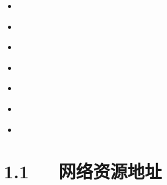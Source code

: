 \documentclass[letterpaper,12pt,english]{sphinxmanual}
\begin{document}
\begin{sphinxShadowBox}
\begin{itemize}
\begin{itemize}
\begin{itemize}
\item {} 
\label{\detokenize{001software/001install/linux:id97}}{\hyperref[\detokenize{001software/001install/linux:id26}]{}}

\item {} 
\label{\detokenize{001software/001install/linux:id98}}{\hyperref[\detokenize{001software/001install/linux:xcopy-win-vs-cp-linux}]{}}

\item {} 
\label{\detokenize{001software/001install/linux:id99}}{\hyperref[\detokenize{001software/001install/linux:gnumake-wildcard-win-vs-cp-linux}]{}}

\item {} 
\label{\detokenize{001software/001install/linux:id100}}{\hyperref[\detokenize{001software/001install/linux:id27}]{}}

\item {} 
\label{\detokenize{001software/001install/linux:id101}}{\hyperref[\detokenize{001software/001install/linux:linuxatime-mtime-ctime}]{}}

\item {} 
\label{\detokenize{001software/001install/linux:id102}}{\hyperref[\detokenize{001software/001install/linux:id28}]{}}

\item {} 
\label{\detokenize{001software/001install/linux:id103}}{\hyperref[\detokenize{001software/001install/linux:id29}]{}}

\end{itemize}

\end{itemize}

\end{itemize}
\end{sphinxShadowBox}


\section{1.1   网络资源地址}
\label{\detokenize{001software/001install/linux:id1}}
\end{document}
